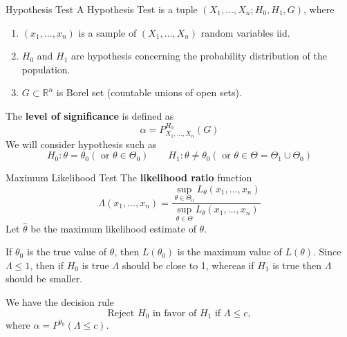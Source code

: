 \documentclass{beamer}
\begin{document}
\begin{frame}{Hypothesis Test}
	A Hypothesis Test is a tuple $(X_1,\ldots, X_n; H_0,H_1,G)$, where
	\begin{enumerate}
		\item $(x_1,\ldots, x_n)$ is a sample of $(X_1,\ldots, X_n)$ random variables iid.
		\item $H_0$ and $H_1$ are hypothesis concerning the probability distribution of the population.
		\item $G\subset \mathbb{R}^n$ is Borel set (countable unions of open sets). 
	\end{enumerate}
	The \textbf{level of significance} is defined as 
	\begin{equation*}
		\alpha = P^{H_0}_{X_1,\ldots, X_n}(G)
	\end{equation*}
	We will consider hypothesis such as
	\begin{equation*}
		H_0\colon \theta=\theta_0 (\text{ or }\theta \in \Theta_0) \qquad H_1 \colon \theta\ne \theta_0 (\text{ or }\theta \in \Theta=\Theta_1\cup \Theta_0)
	\end{equation*}
	
\end{frame}

\begin{frame}{Maximum Likelihood Test}
	The \textbf{likelihood ratio} function
	\begin{equation*}
		\Lambda(x_1,\ldots,x_n)= \frac{\sup_{\theta\in \Theta_0}L_\theta(x_1,\ldots,x_n)}{\sup_{\theta\in \Theta} L_\theta(x_1,\ldots, x_n)}
	\end{equation*}
	Let $\widehat{\theta}$ be the maximum likelihood estimate of $\theta$. 
	
	If $\theta_0$ is the true value of $\theta$, then $L(\theta_0)$ is the maximum value of $L(\theta)$. Since $\Lambda \le 1$, then if $H_0$ is true $\Lambda $ should be close to 1, whereas if $H_1$ is true then $\Lambda$ should be smaller. 
	
	We have the decision rule
	\begin{equation*}
		\text{Reject } H_0 \text{ in favor of } H_1 \text{ if }\Lambda \le c,
	\end{equation*}
	where $\alpha= P^{\theta_0}(\Lambda \le c)$.
\end{frame}
\end{document}
